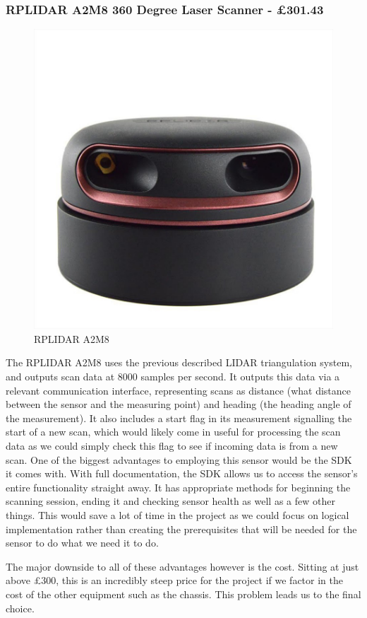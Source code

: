 					\subsubsection{RPLIDAR A2M8 360 Degree Laser Scanner - \pounds{301.43}}
					\begin{figure}[h]
						\centering
						\includegraphics[width=.3\linewidth]{ANALYSIS/rplidara2.jpg}
						\caption{RPLIDAR A2M8}
						\label{fig:rplidara2m8}
					\end{figure}
					The RPLIDAR A2M8 uses the previous described LIDAR triangulation system, and outputs scan data at 8000 samples per second\citep{rplidarm8docs}. It outputs this data via a relevant communication interface, representing scans as distance (what distance between the sensor and the measuring point) and heading (the heading angle of the measurement). It also includes a start flag in its measurement signalling the start of a new scan, which would likely come in useful for processing the scan data as we could simply check this flag to see if incoming data is from a new scan. One of the biggest advantages to employing this sensor would be the SDK it comes with. With full documentation, the SDK allows us to access the sensor's entire functionality straight away. It has appropriate methods for beginning the scanning session, ending it and checking sensor health as well as a few other things. This would save a lot of time in the project as we could focus on logical implementation rather than creating the prerequisites that will be needed for the sensor to do what we need it to do.
					
					The major downside to all of these advantages however is the cost. Sitting at just above \pounds{300}, this is an incredibly steep price for the project if we factor in the cost of the other equipment such as the chassis. This problem leads us to the final choice.
					
